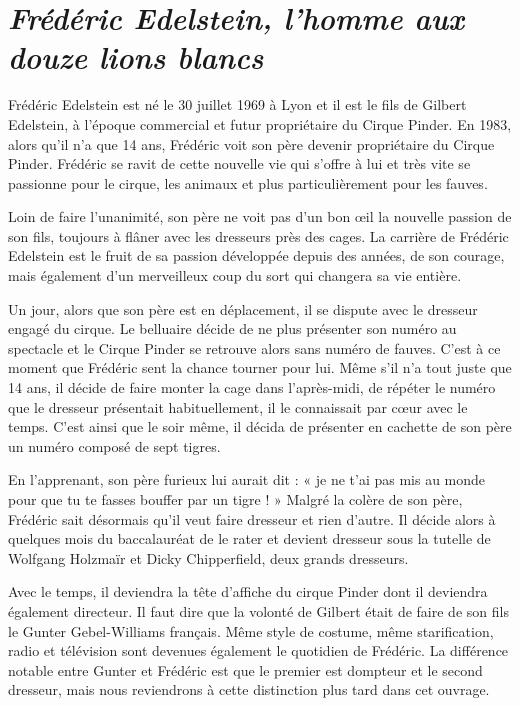 \section*{\textit{Frédéric Edelstein, l’homme aux douze lions blancs}}
{}

Frédéric Edelstein est né le 30 juillet 1969 à Lyon et il est le fils de Gilbert Edelstein, à l’époque commercial et futur propriétaire du Cirque Pinder. En 1983, alors qu'il n'a que 14 ans, Frédéric voit son père devenir propriétaire du Cirque Pinder. Frédéric se ravit de cette nouvelle vie qui s’offre à lui et très vite se passionne pour le cirque, les animaux et plus particulièrement pour les fauves.

Loin de faire l’unanimité, son père ne voit pas d’un bon œil la nouvelle passion de son fils, toujours à flâner avec les dresseurs près des cages. La carrière de Frédéric Edelstein est le fruit de sa passion développée depuis des années, de son courage, mais également d'un merveilleux coup du sort qui changera sa vie entière.

Un jour, alors que son père est en déplacement, il se dispute avec le dresseur engagé du cirque. Le belluaire décide de ne plus présenter son numéro au spectacle et le Cirque Pinder se retrouve alors sans numéro de fauves. C’est à ce moment que Frédéric sent la chance tourner pour lui. Même s'il n’a tout juste que 14 ans, il décide de faire monter la cage dans l’après-midi, de répéter le numéro que le dresseur présentait habituellement, il le connaissait par cœur avec le temps. C’est ainsi que le soir même, il décida de présenter en cachette de son père un numéro composé de sept tigres.

En l’apprenant, son père furieux lui aurait dit : « je ne t’ai pas mis au monde pour que tu te fasses bouffer par un tigre ! » Malgré la colère de son père, Frédéric sait désormais qu’il veut faire dresseur et rien d’autre. Il décide alors à quelques mois du baccalauréat de le rater et devient dresseur sous la tutelle de Wolfgang Holzmaïr et Dicky Chipperfield, deux grands dresseurs.

Avec le temps, il deviendra la tête d’affiche du cirque Pinder dont il deviendra également directeur. Il faut dire que la volonté de Gilbert était de faire de son fils le Gunter Gebel-Williams français. Même style de costume, même starification, radio et télévision sont devenues également le quotidien de Frédéric. La différence notable entre Gunter et Frédéric est que le premier est dompteur et le second dresseur, mais nous reviendrons à cette distinction plus tard dans cet ouvrage.

